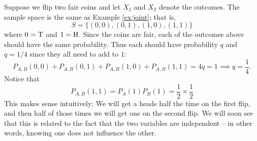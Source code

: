 \begin{example}\label{ex:twocoins} Suppose we flip two fair coins and let $X_1$ and $X_2$ denote the outcomes. The sample space is the same as Example \ref{ex:joint}; that is, 
\begin{equation*}
S = \{(0,0),(0,1),(1,0),(1,1)\}
\end{equation*}
where $0= {\rm T}$ and $1={\rm H}$. 
Since the coins are fair, each of the outcomes above should have the same probability. Thus each should have probability $q$ and $q=1/4$ since they all need to add to $1$:
\begin{equation*}
P_{A,B}(0,0) + P_{A,B}(0,1)+ P_{A,B}(1,0) + P_{A,B}(1,1) = 4q = 1 \implies q = \frac{1}{4}. 
\end{equation*}
Notice that 
\begin{equation*}
P_{A,B}(1,1) = P_A(1)P_B(1)  = \frac{1}{2} \times \frac{1}{2}
\end{equation*}
This makes sense intuitively: We will get a heads half the time on the first flip, and then half of those times we will get one on the second flip. 
We will soon see that this is related to the fact that the two variables are independent -- in other words, knowing one does not influence the other. 



\end{example}
